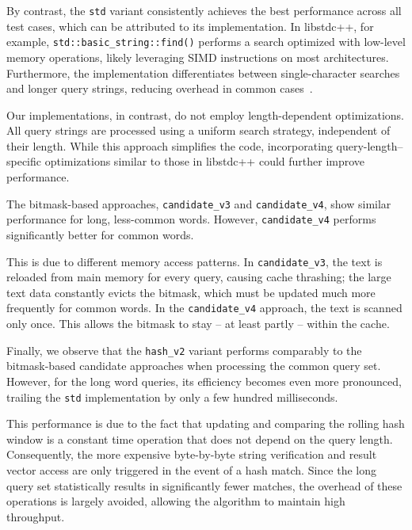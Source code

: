 \documentclass{article}
\begin{document}
    By contrast, the \texttt{std} variant consistently achieves the best performance across all test cases, which can be attributed to its implementation.
    In libstdc++, for example, \texttt{std::basic\_string::find()} performs a search optimized with low-level memory operations, likely leveraging SIMD instructions on most architectures.
    Furthermore, the implementation differentiates between single-character searches and longer query strings, reducing overhead in common cases~\cite{libstdc++}.

    Our implementations, in contrast, do not employ length-dependent optimizations.
    All query strings are processed using a uniform search strategy, independent of their length.
    While this approach simplifies the code, incorporating query-length–specific optimizations similar to those in libstdc++ could further improve performance.

    The bitmask-based approaches, \texttt{candidate\_v3} and \texttt{candidate\_v4}, show similar performance for long, less-common words.
    However, \texttt{candidate\_v4} performs significantly better for common words.

    This is due to different memory access patterns.
    In \texttt{candidate\_v3}, the text is reloaded from main memory for every query, causing cache thrashing; the large text data constantly evicts the bitmask, which must be updated much more frequently for common words.
    In the \texttt{candidate\_v4} approach, the text is scanned only once.
    This allows the bitmask to stay -- at least partly -- within the cache.

    Finally, we observe that the \texttt{hash\_v2} variant performs comparably to the bitmask-based candidate approaches when processing the common query set.
    However, for the long word queries, its efficiency becomes even more pronounced, trailing the \texttt{std} implementation by only a few hundred milliseconds.

    This performance is due to the fact that updating and comparing the rolling hash window is a constant time operation that does not depend on the query length.
    Consequently, the more expensive byte-by-byte string verification and result vector access are only triggered in the event of a hash match.
    Since the long query set statistically results in significantly fewer matches, the overhead of these operations is largely avoided, allowing the algorithm to maintain high throughput.
\end{document}
